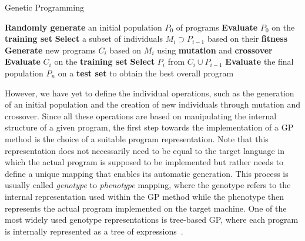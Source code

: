 \begin{algorithm}[t]
	\caption{Genetic Programming}
	\label{alg:genetic-programming}
	\begin{algorithmic}[1] %
		\State \textbf{Randomly generate} an initial population $P_0$ of programs
		\State \textbf{Evaluate} $P_0$ on the \textbf{training set} 
		\State \textbf{Select} a subset of individuals $M_i \supset P_{i-1}$ based on their \textbf{fitness}
		\State \textbf{Generate} new programs $C_i$ based on $M_i$ using \textbf{mutation} and \textbf{crossover}
		\State \textbf{Evaluate} $C_i$ on the \textbf{training set} 
		\State \textbf{Select} $P_{i}$ from $C_i \cup P_{i-1}$
		\EndFor
		\State \textbf{Evaluate} the final population $P_{n}$ on a \textbf{test set}  to obtain the best overall program
	\end{algorithmic}
\end{algorithm}
However, we have yet to define the individual operations, such as the generation of an initial population and the creation of new individuals through mutation and crossover.
Since all these operations are based on manipulating the internal structure of a given program, the first step towards the implementation of a GP method is the choice of a suitable program representation.
Note that this representation does not necessarily need to be equal to the target language in which the actual program is supposed to be implemented but rather needs to define a unique mapping that enables its automatic generation.
This process is usually called \emph{genotype} to \emph{phenotype} mapping, where the genotype refers to the internal representation used within the GP method while the phenotype then represents the actual program implemented on the target machine.
One of the most widely used genotype representations is tree-based GP, where each program is internally represented as a tree of expressions~\cite{koza1994genetic,poli2008field}.
